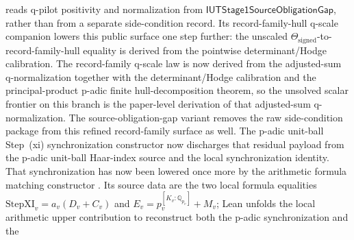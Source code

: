 \begin{proposition}
  reads q-pilot positivity and normalization from
  \(\mathsf{IUTStage1SourceObligationGap}\), rather than from a separate
  side-condition record.
  Its record-family-hull q-scale companion
  lowers this public surface one step further: the unscaled
  \(\Theta_{\mathrm{signed}}\)-to-record-family-hull equality is derived from
  the pointwise determinant/Hodge calibration.  The record-family q-scale law is
  now derived from the adjusted-sum q-normalization together with the
  determinant/Hodge calibration and the principal-product p-adic finite
  hull-decomposition theorem, so the unsolved scalar frontier on this branch is
  the paper-level derivation of that adjusted-sum q-normalization.  The
  source-obligation-gap variant
  removes the raw side-condition package from this refined record-family
  surface as well.
  The p-adic unit-ball Step~(xi) synchronization constructor
  now discharges that residual payload from the p-adic unit-ball Haar-index
  source and the local synchronization identity.
  That synchronization has now been lowered once more by the arithmetic formula
  matching constructor
  .
  Its source data are the two local formula equalities
  \(\mathrm{StepXI}_v=a_v(D_v+C_v)\) and
  \(E_v=p_v^{[K_v:\mathbb Q_{p_v}]}+M_v\); Lean unfolds the local arithmetic
  upper contribution to reconstruct both the p-adic synchronization and the

\end{proposition}
